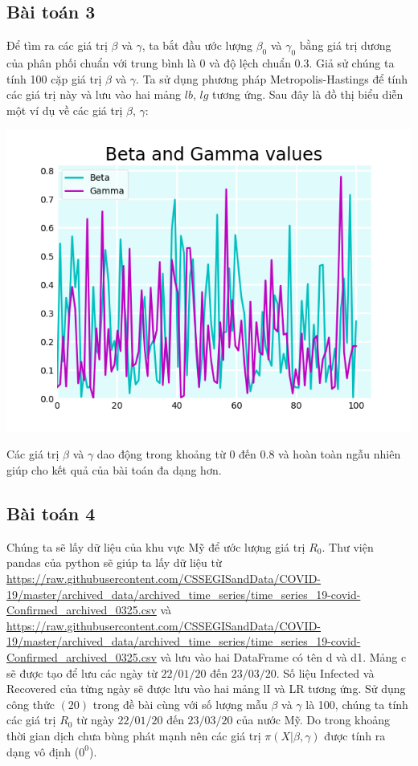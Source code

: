 \documentclass[a4paper]{article}
\begin{document}
\subsection{Bài toán 3}	
Để tìm ra các giá trị $\beta$ và $\gamma$, ta bắt đầu ước lượng $\beta_0$ và $\gamma_0$ bằng giá trị dương của phân phối chuẩn với trung bình là 0 và độ lệch chuẩn 0.3. Giả sử chúng ta tính  100 cặp giá trị $\beta$ và $\gamma$. Ta sử dụng phương pháp Metropolis-Hastings để tính các giá trị này và lưu vào hai mảng $lb$, $lg$ tương ứng. Sau đây là đồ thị biểu diễn một ví dụ về các giá trị $\beta$, $\gamma$:
\begin{center}
\includegraphics[scale=0.6]{Images/Figure_2.png}
\end{center}
Các giá trị $\beta$ và $\gamma$ dao động trong khoảng từ $0$ đến $0.8$ và hoàn toàn ngẫu nhiên giúp cho kết quả của bài toán đa dạng hơn.
\subsection{Bài toán 4}
Chúng ta sẽ lấy dữ liệu của khu vực Mỹ để ước lượng giá trị $R_0$. Thư viện pandas của python sẽ giúp ta lấy dữ liệu từ \url{https://raw.githubusercontent.com/CSSEGISandData/COVID-19/master/archived_data/archived_time_series/time_series_19-covid-Confirmed_archived_0325.csv} và \url{https://raw.githubusercontent.com/CSSEGISandData/COVID-19/master/archived_data/archived_time_series/time_series_19-covid-Confirmed_archived_0325.csv} và lưu vào hai DataFrame có tên d và d1. Mảng c sẽ được tạo để lưu các ngày từ $22/01/20$ đến $23/03/20$. Số liệu Infected và Recovered của từng ngày sẽ được lưu vào hai mảng lI và LR tương ứng. Sử dụng công thức $(20)$ trong đề bài cùng với số lượng mẫu $\beta$ và $\gamma$ là 100, chúng ta tính các giá trị $R_0$ từ ngày $22/01/20$ đến $23/03/20$ của nước Mỹ. Do trong khoảng thời gian dịch chưa bùng phát mạnh nên các giá trị $\pi(X|\beta,\gamma)$ được tính ra dạng vô định ($0^0$). 
\end{document}
